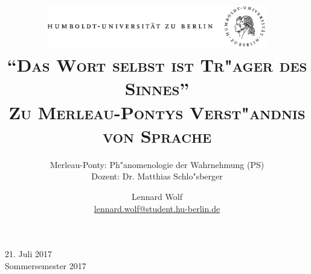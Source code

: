\documentclass[a4paper, emulatestandardclasses, 12pt]{scrartcl}
\date{\vspace{-3ex}}
\begin{document}
\title{\vspace{5ex}
	\includegraphics*[width=0.72\textwidth]{ErstesSem/images/hu_logo.png}\\
	\vspace{30pt}
	\scshape\LARGE{"`Das Wort selbst ist Tr"ager des Sinnes"'}\\\Large{Zu Merleau-Pontys Verst"andnis von Sprache}}
	
	\subtitle{\vspace{20pt}Merleau-Ponty: Ph"anomenologie der Wahrnehmung (PS)\\
	\vspace{6pt}
          Dozent: Dr. Matthias Schlo"sberger}


\author{\vspace{-4pt}Lennard Wolf\\
        \small{\href{mailto:lennard.wolf@student.hu-berlin.de}{lennard.wolf@student.hu-berlin.de}}}      

\maketitle

\vspace{\fill}

\begin{minipage}[b]{\textwidth}
    \centering
    \onehalfspacing
    \large   
    21. Juli 2017\\
    Sommersemester 2017

    \vspace{-20mm} 
\end{minipage}%
\thispagestyle{empty}
\newpage
\setcounter{page}{1}
\end{document}
